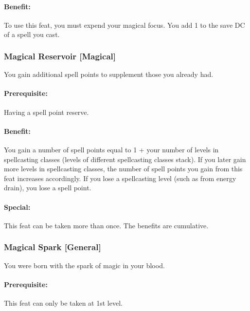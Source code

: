 \paragraph{Benefit:} To use this feat, you must expend your magical focus. You add 1 to the save DC of a spell you cast.

\subsubsection[Magical Reservoir]{Magical Reservoir [Magical]}
\label{Feat:MagicallyGifted}
You gain additional spell points to supplement those you already had.

\paragraph{Prerequisite:} Having a spell point reserve.

\paragraph{Benefit:} You gain a number of spell points equal to 1 + your number of levels in spellcasting classes (levels of different spellcasting classes stack). If you later gain more levels in spellcasting classes, the number of spell points you gain from this feat increases accordingly. If you lose a spellcasting level (such as from energy drain), you lose a spell point.

\paragraph{Special:} This feat can be taken more than once. The benefits are cumulative.

\subsubsection[Magical Spark]{Magical Spark [General]}
\label{Feat:MagicalSpark}
You were born with the spark of magic in your blood.

\paragraph{Prerequisite:} This feat can only be taken at 1st level.


